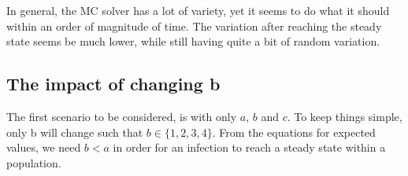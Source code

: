 In general, the MC solver has a lot of variety, yet it seems to do what it should within an order of magnitude of time. 
The variation after reaching the steady state seems be much lower, while still having quite a bit of random variation.

\subsection{The impact of changing b}
The first scenario to be considered, is with only $a$, $b$ and $c$.
To keep things simple, only b will change such that $b\in \{1,2,3,4\}$.
From the equations for expected values, we need $b<a$ in order for an infection to reach a steady state within a population.
\begin{figure}[!h]
    \centering
    \\

\end{figure}
